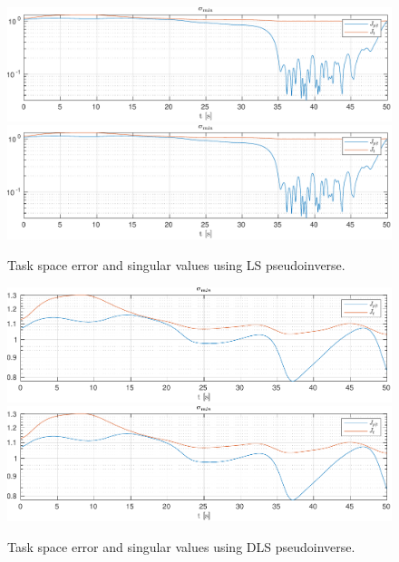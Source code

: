 \begin{figure}[h!]
    \centering
    \includegraphics[page=1,width=\linewidth]{assets/results/LSI.pdf}
    \includegraphics[page=2,width=\linewidth]{assets/results/LSI.pdf}
    \caption{Task space error and singular values using LS pseudoinverse.}
    \label{fig:ls}
\end{figure}

\begin{figure}[h!]
    \centering
    \includegraphics[page=1,width=\linewidth]{assets/results/DLSI.pdf}
    \includegraphics[page=2,width=\linewidth]{assets/results/DLSI.pdf}
    \caption{Task space error and singular values using DLS pseudoinverse.}
    \label{fig:dls}
\end{figure}

